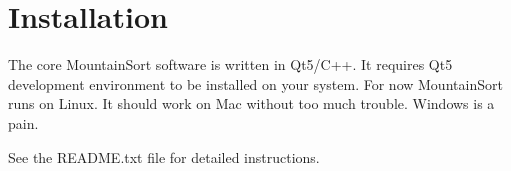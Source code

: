 \documentclass[hidelinks,10pt]{article}
\begin{document}
\section {Installation}

The core MountainSort software is written in Qt5/C++. It requires Qt5 development environment to be installed on your system. For now MountainSort runs on Linux. It should work on Mac without too much trouble. Windows is a pain.

See the README.txt file for detailed instructions.
\end{document}
